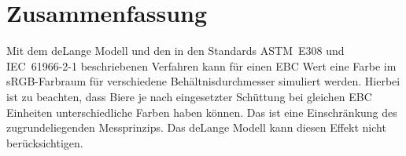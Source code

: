 \documentclass[10pt,a4paper,DIV=12,parskip=half]{scrarticle}
\begin{document}
\section*{Zusammenfassung}

Mit dem deLange Modell und den in den Standards ASTM~E308 und IEC~61966-2-1 beschriebenen Verfahren kann für einen EBC Wert eine Farbe im sRGB-Farbraum für verschiedene Behältnisdurchmesser simuliert werden. Hierbei ist zu beachten, dass Biere je nach eingesetzter Schüttung bei gleichen EBC Einheiten unterschiedliche Farben haben können. Das ist eine Einschränkung des zugrundeliegenden Messprinzips. Das deLange Modell kann diesen Effekt nicht berücksichtigen.

\printbibliography[title=Quellen]
\end{document}
